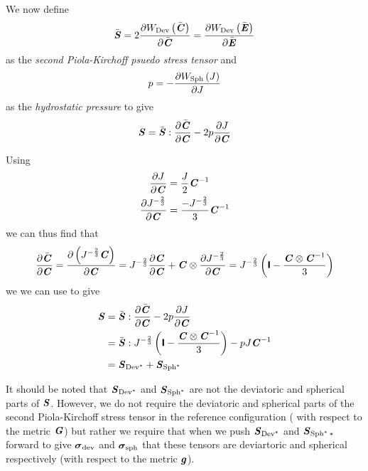 We now define
\begin{equation}
  \bar{\boldsymbol{\mathit{S}}}=2 \dfrac{\partial  W_{\operatorname{Dev}}\left( \bar{\boldsymbol{\mathit{C}}} \right) }{\partial \bar{\boldsymbol{\mathit{C}}}} = \dfrac{\partial  W_{\operatorname{Dev}}\left( \bar{\boldsymbol{\mathit{E}}} \right) }{\partial \bar{\boldsymbol{\mathit{E}}}} 
\end{equation}
as the \emph{second Piola-Kirchoff psuedo stress tensor} and
\begin{equation}
  p = - \dfrac{\partial  W_{\operatorname{Sph}}\left( J \right) }{\partial J} 
\end{equation}
as the \emph{hydrostatic pressure} to give
\begin{equation}
  \boldsymbol{\mathit{S}}=\bar{\boldsymbol{\mathit{S}}}: \dfrac{\partial \bar{\boldsymbol{\mathit{C}}}}{\partial \boldsymbol{\mathit{C}}} -2p \dfrac{\partial J}{\partial \boldsymbol{\mathit{C}}} 
\end{equation}

Using 
\begin{align}
   \dfrac{\partial J}{\partial \boldsymbol{\mathit{C}}} &=\dfrac{J}{2}{\boldsymbol{\mathit{C}}}^{-1} \\
   \dfrac{\partial J^{-\frac{2}{3}}}{\partial \boldsymbol{\mathit{C}}} &=\dfrac{-J^{-\frac{2}{3}}}{3}{\boldsymbol{\mathit{C}}}^{-1}
\end{align}
we can thus find that
\begin{equation}
   \dfrac{\partial \bar{\boldsymbol{\mathit{C}}}}{\partial \boldsymbol{\mathit{C}}} = \dfrac{\partial \left( J^{-\frac{2}{3}}\boldsymbol{\mathit{C}} \right)}{\partial \boldsymbol{\mathit{C}}} =J^{-\frac{2}{3}} \dfrac{\partial \boldsymbol{\mathit{C}}}{\partial \boldsymbol{\mathit{C}}} + \boldsymbol{\mathit{C}} \otimes  \dfrac{\partial J^{-\frac{2}{3}}}{\partial \boldsymbol{\mathit{C}}}  =J^{-\frac{2}{3}}\left( \boldsymbol{\mathsf{I}}-\dfrac{ \boldsymbol{\mathit{C}} \otimes {\ensuremath{\boldsymbol{\mathit{C}}}}^{-1} }{3} \right)
\end{equation}
we we can use to give
\begin{equation}
  \begin{split}
    \boldsymbol{\mathit{S}}&=\bar{\boldsymbol{\mathit{S}}}: \dfrac{\partial \bar{\boldsymbol{\mathit{C}}}}{\partial \boldsymbol{\mathit{C}}} -2p \dfrac{\partial J}{\partial \boldsymbol{\mathit{C}}} \\
    &=
    \bar{\boldsymbol{\mathit{S}}}:J^{-\frac{2}{3}}\left( \boldsymbol{\mathsf{I}}-\dfrac{ \boldsymbol{\mathit{C}} \otimes {\ensuremath{\boldsymbol{\mathit{C}}}}^{-1} }{3} \right)-pJ{\boldsymbol{\mathit{C}}}^{-1}\\
    &=\boldsymbol{\mathit{S}}_{ \operatorname{Dev}^{*} }+\boldsymbol{\mathit{S}}_{ \operatorname{Sph}^{*} }
  \end{split}
\end{equation}

It should be noted that $\boldsymbol{\mathit{S}}_{ \operatorname{Dev}^{*} }$ and
$\boldsymbol{\mathit{S}}_{ \operatorname{Sph}^{*} }$ are not the deviatoric and spherical parts
of $\boldsymbol{\mathit{S}}$. However, we do not require the deviatoric and spherical parts
of the second Piola-Kirchoff stress tensor in the reference configuration (\ie
with respect to the metric $\boldsymbol{\mathit{G}}$) but rather we require that when we
push $\boldsymbol{\mathit{S}}_{ \operatorname{Dev}^{*} }$ and
$\boldsymbol{\mathit{S}}_{ \operatorname{Sph}^{*}* }$ forward to give $\boldsymbol{\mathit{\sigma}}_{\operatorname{dev}}$
and $\boldsymbol{\mathit{\sigma}}_{\operatorname{sph}}$ that these tensors are deviartoric and
spherical respectively (\ie with respect to the metric $\boldsymbol{\mathit{g}}$).

